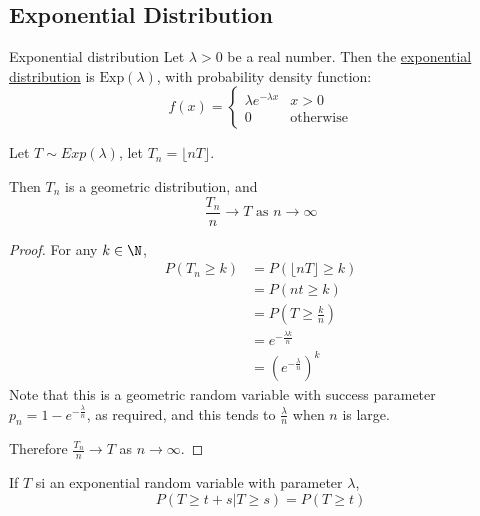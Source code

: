 \documentclass[../Main.tex]{subfiles}
\begin{document}
\subsection{Exponential Distribution}
\begin{definition}{Exponential distribution}
    Let $\lambda > 0$ be a real number. Then the \underline{exponential distribution} is $\text{Exp}(\lambda)$, with probability density function:
    \begin{equation*}
        f(x) =
        \begin{cases}
            \lambda e^{-\lambda x} & x > 0 \\
            0 & \text{otherwise}
        \end{cases}
    \end{equation*}
\end{definition}
\begin{proposition}
    Let $T \sim Exp(\lambda)$, let $T_n = \lfloor nT \rfloor$.\par
    Then $T_n$ is a geometric distribution, and
    \begin{equation*}
        \frac{T_n}{n} \to T \text{ as } n \to \infty
    \end{equation*}
    \label{propExpLimitOfGeom}
\end{proposition}
\begin{proof}
    For any $k \in \N$,
    \begin{align*}
        P(T_n \geq k) &= P(\lfloor nT \rfloor \geq k) \\
        &= P(nt \geq k) \\
        &= P(T \geq \frac{k}{n}) \\
        &= e^{-\frac{\lambda k}{n}} \\
        &= \left(e^{-\frac{\lambda}{n}}\right)^k
    \end{align*}
    Note that this is a geometric random variable with success parameter $p_n = 1 - e^{-\frac{\lambda}{n}}$, as required, and this tends to $\frac{\lambda}{n}$ when $n$ is large.\par
    Therefore $\frac{T_n}{n} \to T$ as $n \to \infty$.
\end{proof}
\begin{proposition}
    If $T$ si an exponential random variable with parameter $\lambda$,
    \begin{equation*}
        P(T \geq t + s | T \geq s) = P(T \geq t)
    \end{equation*}
\label{propMemoryless}
\end{proposition}
\end{document}
